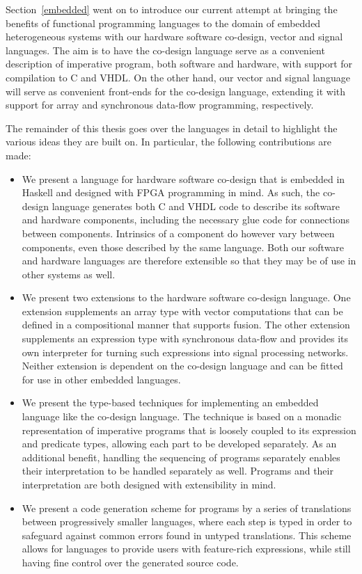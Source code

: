 \documentclass[../paper.tex]{subfiles}
\begin{document}
Section~\ref{embedded} went on to introduce our current attempt at bringing the benefits of functional programming languages to the domain of embedded heterogeneous systems with our hardware software co-design, vector and signal languages. The aim is to have the co-design language serve as a convenient description of imperative program, both software and hardware, with support for compilation to C and VHDL. On the other hand, our vector and signal language will serve as convenient front-ends for the co-design language, extending it with support for array and synchronous data-flow programming, respectively.

The remainder of this thesis goes over the languages in detail to highlight the various ideas they are built on. In particular, the following contributions are made:

\begin{itemize}
\item We present a language for hardware software co-design that is embedded in Haskell and designed with FPGA programming in mind. As such, the co-design language generates both C and VHDL code to describe its software and hardware components, including the necessary glue code for connections between components. Intrinsics of a component do however vary between components, even those described by the same language. Both our software and hardware languages are therefore extensible so that they may be of use in other systems as well.

\item We present two extensions to the hardware software co-design language. One extension supplements an array type with vector computations that can be defined in a compositional manner that supports fusion. The other extension supplements an expression type with synchronous data-flow and provides its own interpreter for turning such expressions into signal processing networks. Neither extension is dependent on the co-design language and can be fitted for use in other embedded languages.

\item We present the type-based techniques for implementing an embedded language like the co-design language. The technique is based on a monadic representation of imperative programs that is loosely coupled to its expression and predicate types, allowing each part to be developed separately. As an additional benefit, handling the sequencing of programs separately enables their interpretation to be handled separately as well. Programs and their interpretation are both designed with extensibility in mind.

\item We present a code generation scheme for programs by a series of translations between progressively smaller languages, where each step is typed in order to safeguard against common errors found in untyped translations. This scheme allows for languages to provide users with feature-rich expressions, while still having fine control over the generated source code.
\end{itemize}
\end{document}
